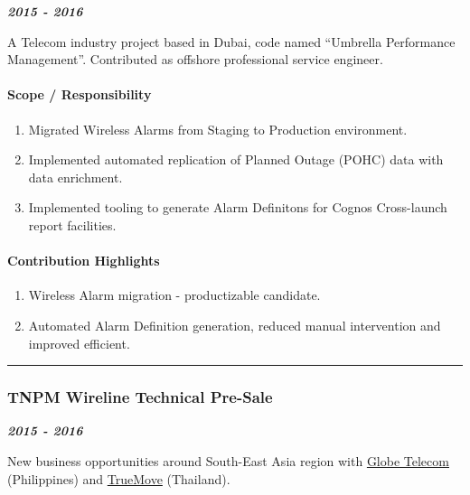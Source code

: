 \documentclass[
]{article}
\providecommand{\tightlist}{%
  \setlength{\itemsep}{0pt}\setlength{\parskip}{0pt}}
\begin{document}
\textbf{\emph{2015 - 2016}}

A Telecom industry project based in Dubai, code named ``Umbrella
Performance Management''. Contributed as offshore professional service
engineer.

\hypertarget{scope-responsibility-7}{%
\paragraph{Scope / Responsibility}\label{scope-responsibility-7}}

\begin{enumerate}
\def\labelenumi{\arabic{enumi}.}
\tightlist
\item
  Migrated Wireless Alarms from Staging to Production environment.
\item
  Implemented automated replication of Planned Outage (POHC) data with
  data enrichment.
\item
  Implemented tooling to generate Alarm Definitons for Cognos
  Cross-launch report facilities.
\end{enumerate}

\hypertarget{contribution-highlights-6}{%
\paragraph{Contribution Highlights}\label{contribution-highlights-6}}

\begin{enumerate}
\def\labelenumi{\arabic{enumi}.}
\tightlist
\item
  Wireless Alarm migration - productizable candidate.
\item
  Automated Alarm Definition generation, reduced manual intervention and
  improved efficient.
\end{enumerate}

\begin{center}\rule{0.5\linewidth}{0.5pt}\end{center}

\hypertarget{tnpm-wireline-technical-pre-sale}{%
\subsubsection{TNPM Wireline Technical
Pre-Sale}\label{tnpm-wireline-technical-pre-sale}}

\textbf{\emph{2015 - 2016}}

New business opportunities around South-East Asia region with
\href{https://www.globe.com.ph/}{Globe Telecom} (Philippines) and
\href{http://truemoveh.truecorp.co.th/?ln=en}{TrueMove} (Thailand).
\end{document}
